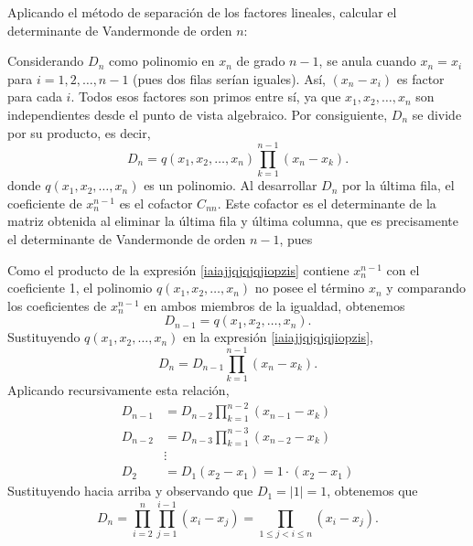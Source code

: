 \begin{examplebox}{}{}
    Aplicando el método de separación de los factores lineales, calcular el determinante de Vandermonde de orden $n$:
    \begin{matrizn}
    \end{matrizn}

    \tcblower
    \solucion Considerando $D_n$ como polinomio en $x_n$ de grado $n - 1$, se anula cuando $x_n = x_i$ para $i = 1, 2, \dots, n - 1$ (pues dos filas serían iguales). Así, $(x_n - x_i)$ es factor para cada $i$. Todos esos factores son primos entre sí, ya que $x_1, x_2, \dots, x_n$ son independientes desde el punto de vista algebraico. Por consiguiente, $D_n$ se divide por su producto, es decir,
    \begin{equation}
        D_n = q(x_1, x_2, \dots, x_n) \prod_{k=1}^{n-1} (x_n - x_k). \label{iaiajjqjqjqjiopzis}
    \end{equation}
    donde $q(x_1, x_2, \dots, x_n)$ es un polinomio. Al desarrollar $D_n$ por la última fila, el coeficiente de $x_n^{n-1}$ es el cofactor $C_{nn}$. Este cofactor es el determinante de la matriz obtenida al eliminar la última fila y última columna, que es precisamente el determinante de Vandermonde de orden $n - 1$, pues
    \begin{matrizn}
    \end{matrizn}
    Como el producto de la expresión \eqref{iaiajjqjqjqjiopzis} contiene $x_n^{n-1}$ con el coeficiente 1, el polinomio $q(x_1, x_2, \dots, x_n)$ no posee el término $x_n$ y comparando los coeficientes de $x_n^{n-1}$ en ambos miembros de la igualdad, obtenemos
    $$D_{n-1} = q(x_1, x_2, \dots, x_n).$$
    \newpage
    Sustituyendo $q(x_1, x_2, \dots, x_n)$ en la expresión \eqref{iaiajjqjqjqjiopzis},
    $$D_n = D_{n-1} \prod_{k=1}^{n-1} (x_n - x_k).$$
    Aplicando recursivamente esta relación,
    \begin{align*}
        D_{n-1} & = D_{n-2} \prod_{k=1}^{n-2} (x_{n-1} - x_k) \\
        D_{n-2} & = D_{n-3} \prod_{k=1}^{n-3} (x_{n-2} - x_k) \\
        & \vdots \\
        D_2 & = D_1 (x_2 - x_1) = 1 \cdot (x_2 - x_1)
    \end{align*}
    Sustituyendo hacia arriba y observando que $D_1 = |1| = 1$, obtenemos que
    $$D_n = \prod_{i=2}^n \prod_{j=1}^{i-1} (x_i - x_j) = \prod_{1 \leq j < i \leq n} (x_i - x_j).$$
\end{examplebox}


